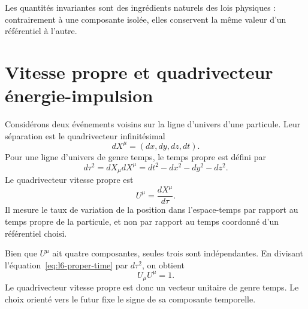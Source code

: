 Les quantités invariantes sont des ingrédients naturels des lois physiques : contrairement à une composante isolée, elles conservent la même valeur d’un référentiel à l’autre.

\section{Vitesse propre et quadrivecteur énergie-impulsion}

Considérons deux événements voisins sur la ligne d’univers d’une particule. Leur séparation est le quadrivecteur infinitésimal \begin{equation}
  dX^\mu=(dx,dy,dz,dt).
\end{equation} Pour une ligne d’univers de genre temps, le temps propre est défini par \begin{equation}
  d\tau^2=dX_\mu dX^\mu
  =dt^2-dx^2-dy^2-dz^2.                                  \label{eq:l6-proper-time}
\end{equation} Le quadrivecteur vitesse propre est \begin{equation}
  U^\mu=\frac{dX^\mu}{d\tau}.                            \label{eq:l6-four-velocity}
\end{equation} Il mesure le taux de variation de la position dans l’espace-temps par rapport au temps propre de la particule, et non par rapport au temps coordonné d’un référentiel choisi.

Bien que \(U^\mu\) ait quatre composantes, seules trois sont indépendantes. En divisant l’équation~\eqref{eq:l6-proper-time} par \(d\tau^2\), on obtient \begin{equation}
  U_\mu U^\mu=1.
\end{equation} Le quadrivecteur vitesse propre est donc un vecteur unitaire de genre temps. Le choix orienté vers le futur fixe le signe de sa composante temporelle.

\begin{classroomqa}
\end{classroomqa}

